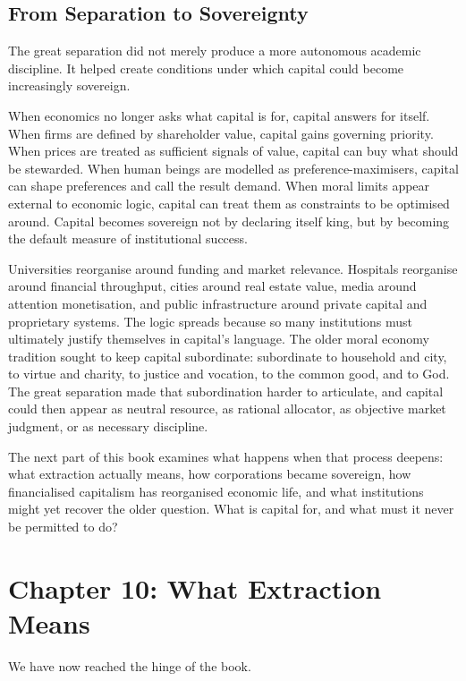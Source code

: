 \documentclass[11pt,a4paper,oneside]{book}
\begin{document}
\section*{From Separation to Sovereignty}

The great separation did not merely produce a more autonomous academic discipline. It helped create conditions under which capital could become increasingly sovereign.

When economics no longer asks what capital is for, capital answers for itself. When firms are defined by shareholder value, capital gains governing priority. When prices are treated as sufficient signals of value, capital can buy what should be stewarded. When human beings are modelled as preference-maximisers, capital can shape preferences and call the result demand. When moral limits appear external to economic logic, capital can treat them as constraints to be optimised around. Capital becomes sovereign not by declaring itself king, but by becoming the default measure of institutional success.

Universities reorganise around funding and market relevance. Hospitals reorganise around financial throughput, cities around real estate value, media around attention monetisation, and public infrastructure around private capital and proprietary systems. The logic spreads because so many institutions must ultimately justify themselves in capital's language. The older moral economy tradition sought to keep capital subordinate: subordinate to household and city, to virtue and charity, to justice and vocation, to the common good, and to God. The great separation made that subordination harder to articulate, and capital could then appear as neutral resource, as rational allocator, as objective market judgment, or as necessary discipline.

The next part of this book examines what happens when that process deepens: what extraction actually means, how corporations became sovereign, how financialised capitalism has reorganised economic life, and what institutions might yet recover the older question. What is capital for, and what must it never be permitted to do?

\chapter*{Chapter 10: What Extraction Means}

We have now reached the hinge of the book.
\end{document}
